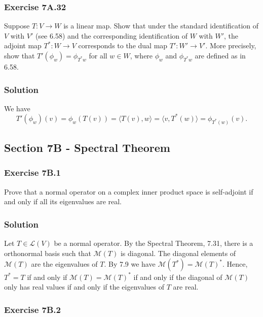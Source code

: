 \subsubsection*{Exercise 7A.32}

Suppose $T: V \to W$ is a linear map.
Show that under the standard identification of $V$ with $V'$ (see 6.58) and the corresponding identification of $W$ with $W'$, the adjoint map $T^*: W \to V$ corresponds to the dual map $T': W' \to V'$.
More precisely, show that $T'(\phi_w) = \phi_{T^*w}$ for all $w \in W$, where $\phi_w$ and $\phi_{T^*w}$ are defined as in 6.58.

\subsubsection*{Solution}

We have
\begin{equation*}
    T'(\phi_w)(v)
        = \phi_w(T(v))
        = \langle T(v), w \rangle
        = \langle v, T^*(w) \rangle
        = \phi_{T^*(w)}(v).
\end{equation*}


\subsection*{Section 7B - Spectral Theorem}

\subsubsection*{Exercise 7B.1}

Prove that a normal operator on a complex inner product space is self-adjoint if and only if all its eigenvalues are real.

\subsubsection*{Solution}

Let $T \in \mathcal{L}(V)$ be a normal operator.
By the Spectral Theorem, 7.31, there is a orthonormal basis such that $\mathcal{M}(T)$ is diagonal.
The diagonal elements of $\mathcal{M}(T)$ are the eigenvalues of $T$.
By 7.9 we have $\mathcal{M}(T^*) = \mathcal{M}(T)^*$.
Hence, $T^* = T$ if and only if $\mathcal{M}(T) = \mathcal{M}(T)^*$ if and only if the diagonal of $\mathcal{M}(T)$ only has real values if and only if the eigenvalues of $T$ are real.


\subsubsection*{Exercise 7B.2}

